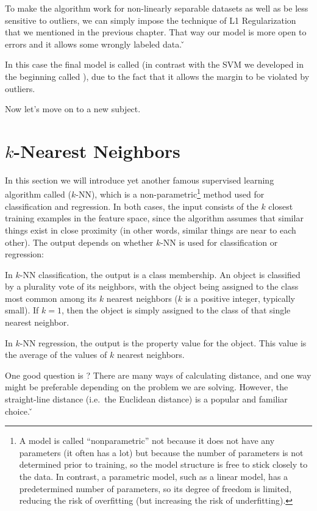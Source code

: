 To make the algorithm work for non-linearly separable datasets as well as be less sensitive to outliers, we can
simply impose the technique of L1 Regularization that we mentioned in the previous chapter. That way our model is
more open to errors and it allows some wrongly labeled data. \v


In this case the final model is called  (in contrast with the SVM we
developed in the beginning called ), due to the fact that it allows the
margin to be violated by outliers.
\eit

Now let's move on to a new subject.

\section{$k$-Nearest Neighbors}

In this section we will introduce yet another famous supervised learning algorithm called  ($k$-NN), which is a non-parametric\footnote{A model is called ``nonparametric'' not because it does not
have any parameters (it often has a lot) but because the number of parameters is not determined prior to training, so
the model structure is free to stick closely to the data. In contrast, a parametric model, such as a linear model,
has a predetermined number of parameters, so its degree of freedom is limited, reducing the risk of overfitting
(but increasing the risk of underfitting).} method used for classification and regression. In both cases, the
input consists of the $k$ closest training examples in the feature space, since the algorithm assumes that similar
things exist in close proximity (in other words, similar things are near to each other). The output depends on
whether $k$-NN is used for classification or regression:
\bit
\item In $k$-NN classification, the output is a class membership. An object is classified by a plurality vote of its
neighbors, with the object being assigned to the class most common among its $k$ nearest neighbors ($k$ is a positive
integer, typically small). If $k = 1$, then the object is simply assigned to the class of that single nearest neighbor.
\item In $k$-NN regression, the output is the property value for the object. This value is the average of the values
of $k$ nearest neighbors.
\eit

One good question is ? There are many ways of calculating
distance, and one way might be preferable depending on the problem we are solving. However, the straight-line
distance (i.e.\ the Euclidean distance) is a popular and familiar choice. \v

